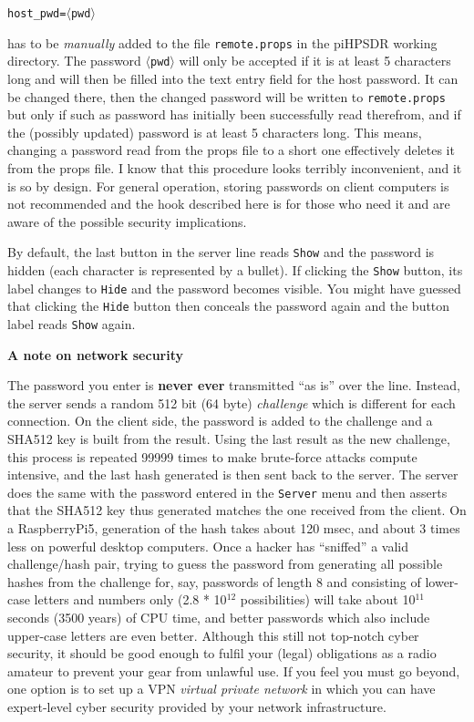 \documentclass[12pt]{book}
\def\rett#1{\texttt{\color{red}#1}}
\def\bltt#1{\texttt{\color{blue}#1}}
\def\pH{pi\-HPSDR\xspace}
\begin{document}
\texttt{host\_pwd=}$\langle$\texttt{pwd}$\rangle$

has to be \textit{manually} added to the file \texttt{remote.props} in the \pH working directory. The
password $\langle$\texttt{pwd}$\rangle$ will only be accepted if it is at least 5 characters long
and will then be filled into the text entry field for the host password. It can be changed there,
then the changed password will be written to \texttt{remote.props} but only if such as password
has initially been successfully read therefrom, and if the (possibly updated) password is at least
5 characters long. This means, changing a password read from the props file to a short one effectively
deletes it from the props file. I know that this procedure looks terribly inconvenient, and it is so
by design. For general operation, storing passwords on client computers is not recommended and the
hook described here is for those who need it and are aware of the possible security implications.

By default, the last button in
the server line reads \rett{Show} and the password is hidden (each character is represented by a bullet).
If clicking the \rett{Show} button, its label changes to \rett{Hide} and the password becomes visible. You
might have guessed that clicking the \rett{Hide} button then conceals the password again and the button
label reads \rett{Show} again.

\textbf{A note on network security}

The password you enter is \textbf{never ever} transmitted ``as is'' over the line. Instead, the server sends a random
512 bit (64 byte) \textit{challenge} which is different for each connection.
On the client side,  the password is added
to the challenge and a SHA512 key is built from the result.  Using the last result as the new challenge,
this process is repeated 99999 times to make brute-force attacks compute intensive,
and the last hash generated is then sent back to the server. The server
does the same with the password entered in the \bltt{Server} menu and then asserts
that the SHA512 key thus generated matches the one received from the client.
On a RaspberryPi5, generation of the hash takes about 120 msec, and about 3 times less on powerful desktop
computers. Once a hacker has ``sniffed'' a valid challenge/hash pair, trying to guess the password
from generating all possible hashes
from the challenge for, say, passwords of length 8 and consisting of lower-case letters and numbers only
(2.8 * 10$^{12}$ possibilities) will take about 10$^{11}$ seconds (3500 years) of CPU time, and better
passwords which also include upper-case letters are even better.
Although this still  not  top-notch cyber security, it should be good enough
to fulfil your  (legal) obligations as a radio amateur to prevent your gear from unlawful use.
If you feel you must go beyond, one option is to set up a VPN \textit{virtual private network} in which
you can have expert-level cyber security provided by your network infrastructure.
\end{document}
